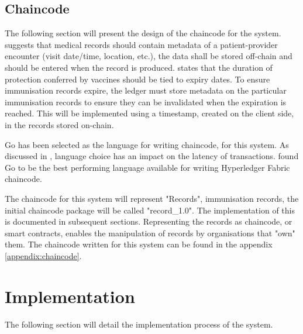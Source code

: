\subsection{Chaincode}
The following section will present the design of the chaincode for the system. 
\cite{alexaki_blockchain-based_2018} suggests that medical records should contain metadata of a patient-provider encounter (visit date/time, location, etc.), 
the data shall be stored off-chain and should be entered when the record is produced. 
\cite{dye_covid-19_2021} states that the duration of protection conferred by vaccines should
be tied to expiry dates.
To ensure immunisation records expire, the ledger must store metadata on the particular immunisation records to ensure they can be invalidated when the expiration is reached. 
This will be implemented using a timestamp, created on the client side, in the records stored on-chain. 

Go has been selected as the language for writing chaincode, for this system. 
As discussed in \cite{foschini_hyperledger_2020}, language choice has an impact on the latency of transactions. 
\cite{foschini_hyperledger_2020} found Go to be the best performing language available for writing Hyperledger Fabric chaincode.  

The chaincode for this system will represent "Records", immunisation records, the initial chaincode package will be called "record\_1.0". The implementation of this is documented in subsequent sections. 
Representing the records as chaincode, or smart contracts, enables the manipulation of records by organisations that "own" them. 
The chaincode written for this system can be found in the appendix \ref{appendix:chaincode}. 



\section{Implementation}
The following section will detail the implementation process of the system.

